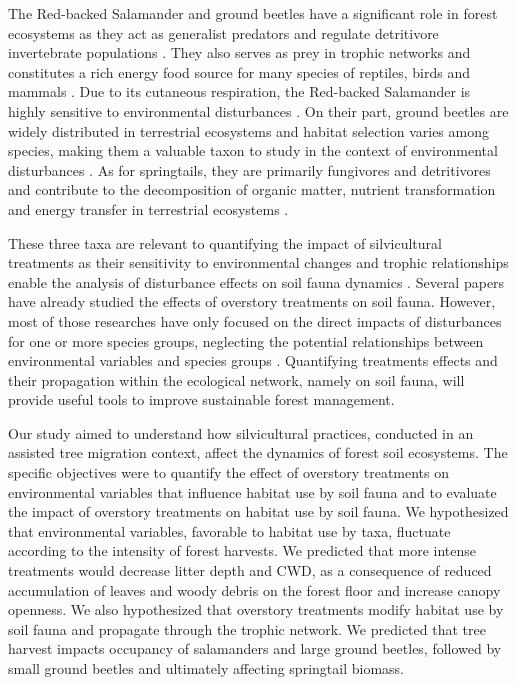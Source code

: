 The Red-backed Salamander and ground beetles have a significant role in forest ecosystems as they act as generalist predators and regulate detritivore invertebrate populations \citep{Burton1975Energyflow,loveiEcologyBehaviorGround1996,Walton2013Topdownregulation,Hickerson2017Easternredbacked}. 
They also serves as prey in trophic networks and constitutes a rich energy food source for many species of reptiles, birds and mammals \citep{Burton1975Energyflow,Pough1987abundancesalamanders,loveiEcologyBehaviorGround1996}. 
Due to its cutaneous respiration, the Red-backed Salamander is highly sensitive to environmental disturbances \citep{Welsh2001caseusing}.
On their part, ground beetles are widely distributed in terrestrial ecosystems and habitat selection varies among species, making them a valuable taxon to study in the context of environmental disturbances \citep{Luff1992Classificationprediction,Larochelle2003naturalhistory,Work2008Evaluationcarabid,bouchardBeetleCommunityResponse2016b}. 
As for springtails, they are primarily fungivores and detritivores and contribute to the decomposition of organic matter, nutrient transformation and energy transfer in terrestrial ecosystems \citep{rusekBiodiversityCollembolaTheir1998,Hattenschwiler2005Biodiversitylitter,Cuchta2019importantrole,Marsden2020Howagroforestry}.

These three taxa are relevant to quantifying the impact of silvicultural treatments as their sensitivity to environmental changes and trophic relationships enable the analysis of disturbance effects on soil fauna dynamics \citep{Salmon2008Relationshipssoil,}.
Several papers have already studied the effects of overstory treatments on soil fauna.
However, most of those researches have only focused on the direct impacts of disturbances for one or more species groups, neglecting the potential relationships between environmental variables and species groups \citep{josephIntegratingOccupancyModels2016,Pollierer2021Diversityfunctional,Kudrin2023metaanalysiseffects}. 
Quantifying treatments effects and their propagation within the ecological network, namely on soil fauna, will provide useful tools to improve sustainable forest management.

Our study aimed to understand how silvicultural practices, conducted in an assisted tree migration context, affect the dynamics of forest soil ecosystems. 
The specific objectives were to quantify the effect of overstory treatments on environmental variables that influence habitat use by soil fauna
and to evaluate the impact of overstory treatments on habitat use by soil fauna.
We hypothesized that environmental variables, favorable to habitat use by taxa, fluctuate according to the intensity of forest harvests. 
We predicted that more intense treatments would decrease litter depth and CWD, as a consequence of reduced accumulation of leaves and woody debris on the forest floor and increase canopy openness. 
We also hypothesized that overstory treatments modify habitat use by soil fauna and propagate through the trophic network. 
We predicted that tree harvest impacts occupancy of salamanders and large ground beetles, 
followed by small ground beetles and ultimately affecting springtail biomass. 


